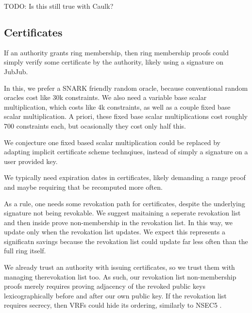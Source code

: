 TODO:  Is this still true with Caulk?


\subsection{Certificates} %

If an authority grants ring membership, then ring membership proofs
could simply verify some certificate by the authority, likely using
a signature on JubJub.

In this, we prefer a SNARK friendly random oracle,
because conventional random oracles cost like 30k constraints.
We also need a variable base scalar multiplication, which costs like
4k constraints, as well as a couple fixed base scalar multiplication.
A priori, these fixed base scalar multiplications cost roughly 700
constraints each, but ocasionally they cost only half this.   

We conjecture one fixed based scalar multiplication could be replaced
by adapting implicit certificate scheme technqiues,
 instead of simply a signature on a user provided key.

We typically need expiration dates in certificates, likely demanding
a range proof and maybe requiring that \pipk be recomputed more often.


As a rule, one needs some revokation path for certificates,
despite the underlying signature not being revokable. 
%
We suggest maitaining a seperate revokation list and then inside
\pipk prove non-membership in the revokation list.
In this way, we update \pipk only when the revokation list updates.
We expect this represents a significatn savings because the revokation
list could update far less often than the full ring \ctx itself.

We already trust an authority with issuing certificates, so we trust
them with managing therevokation list too.  As such, our revokation list
non-membership proofs merely requires proving adjacency of the revoked
public keys lexicographically before and after our own public key.
If the revokation list requires secrecy, then VRFs could hide its ordering,
similarly to NSEC5 \cite{nsec5}.


